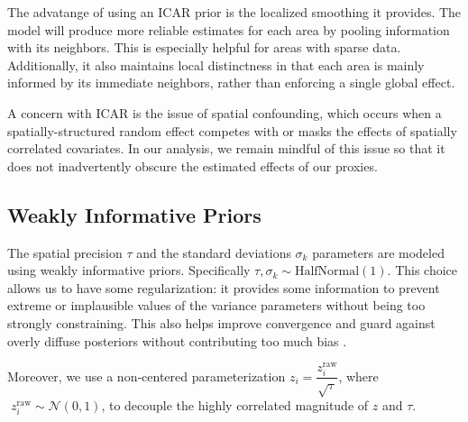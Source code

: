 \documentclass[12pt]{article}
\begin{document}
The advatange of using an ICAR prior is the localized smoothing it provides. The model will produce more reliable estimates for each area by pooling information with its neighbors. This is especially helpful for areas with sparse data. Additionally, it also maintains local distinctness in that each area is mainly informed by its immediate neighbors, rather than enforcing a single global effect.

A concern with ICAR is the issue of spatial confounding, which occurs when a spatially-structured random effect competes with or masks the effects of spatially correlated covariates. In our analysis, we remain mindful of this issue so that it does not inadvertently obscure the estimated effects of our proxies.


\subsection{Weakly Informative Priors}

The spatial precision $\tau$ and the standard deviations $\sigma_k$ parameters are modeled using weakly informative priors. Specifically $\tau, \sigma_k \sim \text{HalfNormal}(1)$. This choice allows us to have some regularization: it provides some information to prevent extreme or implausible values of the variance parameters without being too strongly constraining. This also helps improve convergence and guard against overly diffuse posteriors without contributing too much bias \parencite{gelman2006prior}.


Moreover, we use a non‑centered parameterization $z_i = \dfrac{z_i^{\mathrm{raw}}}{\sqrt{\tau}}$, where $\; z_i^{\mathrm{raw}}\sim\mathcal N(0,1)$, to decouple the highly correlated magnitude of $z$ and $\tau$.
\end{document}
